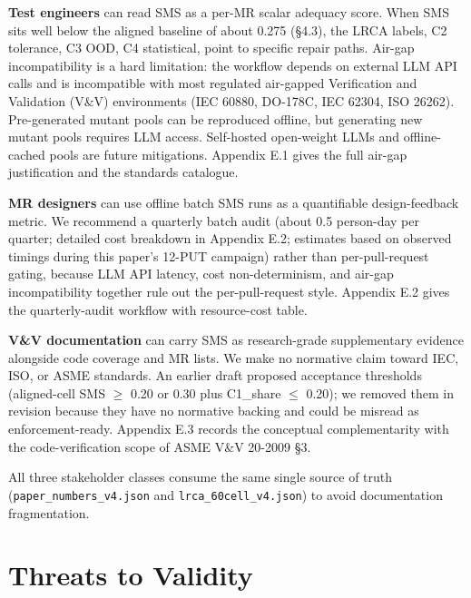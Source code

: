 \documentclass[manuscript,screen,review]{acmart}
\begin{document}
\textbf{Test engineers} can read SMS as a per-MR scalar adequacy score.
When SMS sits well below the aligned baseline of about 0.275 (§4.3), the
LRCA labels, C2 tolerance, C3 OOD, C4 statistical, point to specific
repair paths. Air-gap incompatibility is a hard limitation: the workflow
depends on external LLM API calls and is incompatible with most
regulated air-gapped Verification and Validation (V\&V) environments
(IEC 60880, DO-178C, IEC 62304, ISO 26262). Pre-generated mutant pools
can be reproduced offline, but generating new mutant pools requires LLM
access. Self-hosted open-weight LLMs and offline-cached pools are future
mitigations. Appendix E.1 gives the full air-gap justification and the
standards catalogue.

\textbf{MR designers} can use offline batch SMS runs as a quantifiable
design-feedback metric. We recommend a quarterly batch audit (about 0.5
person-day per quarter; detailed cost breakdown in Appendix E.2;
estimates based on observed timings during this paper's 12-PUT campaign)
rather than per-pull-request gating, because LLM API latency, cost
non-determinism, and air-gap incompatibility together rule out the
per-pull-request style. Appendix E.2 gives the quarterly-audit workflow
with resource-cost table.

\textbf{V\&V documentation} can carry SMS as research-grade
supplementary evidence alongside code coverage and MR lists. We make no
normative claim toward IEC, ISO, or ASME standards. An earlier draft
proposed acceptance thresholds (aligned-cell SMS $\geq$ 0.20 or 0.30 plus
C1\_share $\leq$ 0.20); we removed them in revision because they have no
normative backing and could be misread as enforcement-ready. Appendix
E.3 records the conceptual complementarity with the code-verification
scope of ASME V\&V 20-2009 §3.

All three stakeholder classes consume the same single source of truth
(\texttt{paper\_numbers\_v4.json} and \texttt{lrca\_60cell\_v4.json}) to
avoid documentation fragmentation.


\section{Threats to Validity}\label{threats-to-validity}
\end{document}
